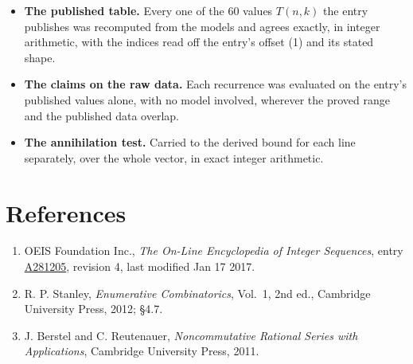 \documentclass[11pt]{article}
\theoremstyle{definition}
\begin{document}
\begin{itemize}

\item {\bfseries The published table.} Every one of the 60 values $T(n,k)$ the entry publishes was recomputed from the models and agrees exactly, in integer arithmetic, with the indices read off the entry's offset (1) and its stated shape.

\item {\bfseries The claims on the raw data.} Each recurrence was evaluated on the entry's published values alone, with no model involved, wherever the proved range and the published data overlap.

\item {\bfseries The annihilation test.} Carried to the derived bound for each line separately, over the whole vector, in exact integer arithmetic.

\end{itemize}

\section{References}

\begin{enumerate}

\item OEIS Foundation Inc., \emph{The On-Line Encyclopedia of Integer Sequences}, entry \href{https://oeis.org/A281205}{A281205}, revision 4, last modified Jan 17 2017.

\item R. P. Stanley, \emph{Enumerative Combinatorics}, Vol.~1, 2nd ed., Cambridge University Press, 2012; \S4.7.

\item J. Berstel and C. Reutenauer, \emph{Noncommutative Rational Series with Applications}, Cambridge University Press, 2011.

\end{enumerate}
\end{document}
